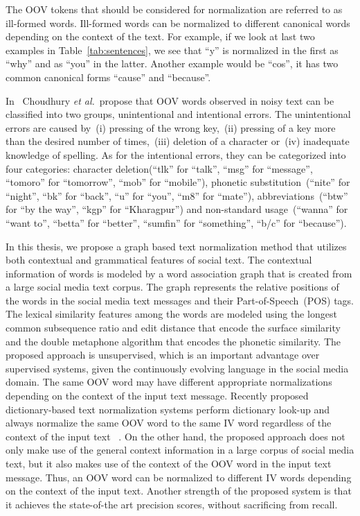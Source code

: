 \documentclass[a4paper,onesided,12pt]{report}
\begin{document}
The OOV tokens that should be considered for normalization are referred to as ill-formed words. Ill-formed words can be normalized to different canonical words depending on the context of the text. For example, if we look at last two examples in Table~\ref{tab:sentences}, we see that ``y'' is normalized in the first as ``why'' and as ``you'' in the latter. Another example would be ``cos'', it has two common canonical forms ``cause'' and ``because''.

In~\cite{Choudhury:2007:IMS:1326044.1326048} Choudhury \textit{et al.}~propose that OOV words observed in noisy text can be classified into two groups, unintentional and intentional errors. The unintentional errors are caused by~(i) pressing of the wrong key,~(ii) pressing of a key more than the desired number of times,~(iii) deletion of a character or~(iv) inadequate knowledge of spelling. As for the intentional errors, they can be categorized into four categories: character deletion(``tlk'' for ``talk'', ``msg'' for ``message'', ``tomoro'' for ``tomorrow'', ``mob'' for ``mobile''), phonetic substitution~(``nite'' for ``night'', ``bk'' for ``back'', ``u'' for ``you'', ``m8'' for ``mate''), abbreviations~(``btw'' for ``by the way'', ``kgp'' for ``Kharagpur'') and non-standard usage~(``wanna'' for ``want to'', ``betta'' for ``better'', ``sumfin'' for ``something'', ``b/c'' for ``because'').

In this thesis, we propose a graph based text normalization method that utilizes both contextual and grammatical features of social text. The contextual information of words is modeled by a word association graph that is created from a large social media text corpus. The graph represents the relative positions of the words in the social media text messages and their Part-of-Speech~(POS) tags. The lexical similarity features among the words are modeled using the longest common subsequence ratio and edit distance that encode the surface similarity and the double metaphone algorithm that encodes the phonetic similarity. The proposed approach is unsupervised, which is an important advantage over supervised systems, given the continuously evolving language in the social media domain. The same OOV word may have different appropriate normalizations depending on the context of the input text message. Recently proposed dictionary-based text normalization systems perform dictionary look-up and always normalize the same OOV word to the same IV word regardless of the context of the input text ~\cite{Han:2011:LNS:2002472.2002520,DBLP:conf/acl/HassanM13}. On the other hand, the proposed approach does not only make use of the general context information in a large corpus of social media text, but it also makes use of the context of the OOV word in the input text message. Thus, an OOV word can be normalized to different IV words depending on the context of the input text. Another strength of the proposed system is that it achieves the state-of-the art precision scores, without sacrificing from recall.
\end{document}
